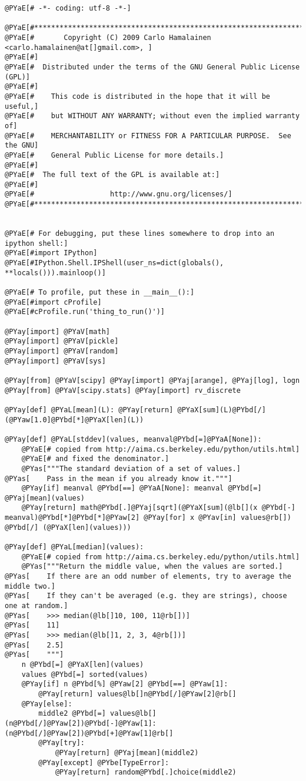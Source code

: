 \begin{Verbatim}[commandchars=@\[\]]
@PYaE[# -*- coding: utf-8 -*-]

@PYaE[#*****************************************************************************]
@PYaE[#       Copyright (C) 2009 Carlo Hamalainen <carlo.hamalainen@at[]gmail.com>, ]
@PYaE[#]
@PYaE[#  Distributed under the terms of the GNU General Public License (GPL)]
@PYaE[#]
@PYaE[#    This code is distributed in the hope that it will be useful,]
@PYaE[#    but WITHOUT ANY WARRANTY; without even the implied warranty of]
@PYaE[#    MERCHANTABILITY or FITNESS FOR A PARTICULAR PURPOSE.  See the GNU]
@PYaE[#    General Public License for more details.]
@PYaE[#]
@PYaE[#  The full text of the GPL is available at:]
@PYaE[#]
@PYaE[#                  http://www.gnu.org/licenses/]
@PYaE[#*****************************************************************************]


@PYaE[# For debugging, put these lines somewhere to drop into an ipython shell:]
@PYaE[#import IPython]
@PYaE[#IPython.Shell.IPShell(user_ns=dict(globals(), **locals())).mainloop()]

@PYaE[# To profile, put these in __main__():]
@PYaE[#import cProfile]
@PYaE[#cProfile.run('thing_to_run()')]

@PYay[import] @PYaV[math]
@PYay[import] @PYaV[pickle]
@PYay[import] @PYaV[random]
@PYay[import] @PYaV[sys]

@PYay[from] @PYaV[scipy] @PYay[import] @PYaj[arange], @PYaj[log], logn
@PYay[from] @PYaV[scipy.stats] @PYay[import] rv_discrete

@PYay[def] @PYaL[mean](L): @PYay[return] @PYaX[sum](L)@PYbd[/](@PYaw[1.0]@PYbd[*]@PYaX[len](L))

@PYay[def] @PYaL[stddev](values, meanval@PYbd[=]@PYaA[None]):
    @PYaE[# copied from http://aima.cs.berkeley.edu/python/utils.html]
    @PYaE[# and fixed the denominator.]
    @PYas["""The standard deviation of a set of values.]
@PYas[    Pass in the mean if you already know it."""]
    @PYay[if] meanval @PYbd[==] @PYaA[None]: meanval @PYbd[=] @PYaj[mean](values)
    @PYay[return] math@PYbd[.]@PYaj[sqrt](@PYaX[sum](@lb[](x @PYbd[-] meanval)@PYbd[*]@PYbd[*]@PYaw[2] @PYay[for] x @PYav[in] values@rb[]) @PYbd[/] (@PYaX[len](values)))

@PYay[def] @PYaL[median](values):
    @PYaE[# copied from http://aima.cs.berkeley.edu/python/utils.html]
    @PYas["""Return the middle value, when the values are sorted.]
@PYas[    If there are an odd number of elements, try to average the middle two.]
@PYas[    If they can't be averaged (e.g. they are strings), choose one at random.]
@PYas[    >>> median(@lb[]10, 100, 11@rb[])]
@PYas[    11]
@PYas[    >>> median(@lb[]1, 2, 3, 4@rb[])]
@PYas[    2.5]
@PYas[    """]
    n @PYbd[=] @PYaX[len](values)
    values @PYbd[=] sorted(values)
    @PYay[if] n @PYbd[%] @PYaw[2] @PYbd[==] @PYaw[1]:
        @PYay[return] values@lb[]n@PYbd[/]@PYaw[2]@rb[]
    @PYay[else]:
        middle2 @PYbd[=] values@lb[](n@PYbd[/]@PYaw[2])@PYbd[-]@PYaw[1]:(n@PYbd[/]@PYaw[2])@PYbd[+]@PYaw[1]@rb[]
        @PYay[try]:
            @PYay[return] @PYaj[mean](middle2)
        @PYay[except] @PYbe[TypeError]:
            @PYay[return] random@PYbd[.]choice(middle2)


\end{Verbatim}
